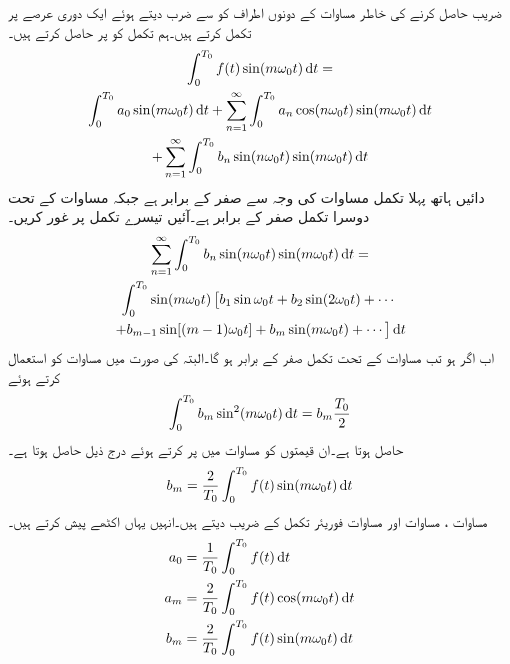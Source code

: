 ضریب   حاصل کرنے کی خاطر مساوات  کے دونوں اطراف کو  سے ضرب دیتے ہوئے ایک دوری عرصے پر تکمل کرتے ہیں۔ہم تکمل کو  پر حاصل کرتے ہیں۔
\begin{multline}\label{مساوات_فوریئر_عددی_سر_کا_حصول_ب}
\int_0^{T_0}f(t) \sin (m \omega_0 t) \dif t=\\
\int_0^{T_0} a_0 \sin (m\omega_0 t) \dif t+\sum_{n=1}^{\infty}  \int_0^{T_0} a_n\cos (n \omega_0 t)  \sin (m \omega_0 t) \dif t \\
+\sum_{n=1}^{\infty} \int_0^{T_0} b_n \sin (n \omega_0 t) \sin (m\omega_0 t) \dif t
\end{multline}
دائیں ہاتھ پہلا تکمل مساوات  کی وجہ سے صفر کے برابر ہے جبکہ مساوات  کے تحت دوسرا تکمل صفر کے برابر ہے۔آئیں تیسرے تکمل پر غور کریں۔
\begin{multline*}
\sum_{n=1}^{\infty} \int_0^{T_0} b_n \sin (n \omega_0 t) \sin (m\omega_0 t) \dif t=\\
\int_0^{T_0} \sin (m\omega_0 t)\left[b_1 \sin \omega_0 t+b_2\sin (2\omega_0 t)+\cdots \right.\\
\left.+b_{m-1}\sin[(m-1)\omega_0 t]+b_m\sin(m\omega_0 t)+\cdots \right] \dif t
\end{multline*}
اب اگر  ہو تب مساوات  کے تحت تکمل صفر کے برابر ہو گا۔البتہ  کی صورت میں مساوات  کو استعمال کرتے ہوئے
\begin{align*}
\int_0^{T_0}b_m \sin^2 (m\omega_0 t) \dif t=b_m\frac{T_0}{2}
\end{align*} 
حاصل ہوتا ہے۔ان قیمتوں کو مساوات  میں پر کرتے ہوئے درج ذیل حاصل ہوتا ہے۔
\begin{align}\label{مساوات_فوریئر_عددی_سر_پ}
b_m=\frac{2}{T_0}\int_0^{T_0}f(t) \sin (m \omega_0 t) \dif t
\end{align}
مساوات ، مساوات  اور مساوات  فوریئر تکمل کے  ضریب  دیتے ہیں۔انہیں یہاں اکٹھے پیش کرتے ہیں۔
\begin{gather}
\begin{aligned}\label{مساوات_فوریئر_عددی_سر_ت}
a_0&=\frac{1}{T_0}\int_0^{T_0}f(t) \dif t\\
a_m&=\frac{2}{T_0}\int_0^{T_0}f(t) \cos (m \omega_0 t) \dif t\\
b_m&=\frac{2}{T_0}\int_0^{T_0}f(t) \sin (m \omega_0 t) \dif t
\end{aligned}
\end{gather}

